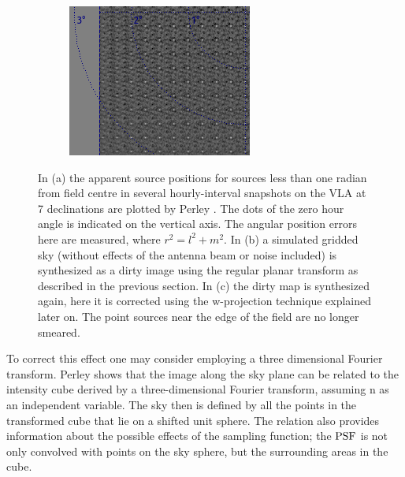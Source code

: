 \begin{figure}[ht!]
\begin{mdframed}
\begin{subfigure}[b]{0.49\textwidth}
      \caption{}
    \end{subfigure}
    \begin{subfigure}[b]{0.49\textwidth}
      \centering
      \includegraphics[width=\textwidth]{images/widefield_corrected_meerkat.png}
      \caption{}
    \end{subfigure}
    \caption[Apparent shift in source position and resulting decorrelation]{In (a) the apparent source positions for sources less than one radian from field centre in 
    several hourly-interval snapshots on the VLA at 7 declinations are plotted by Perley \cite[Lecture 19]{taylor1999synthesis}. The dots of the zero hour angle is indicated on the vertical 
    axis. The angular position errors here are measured, where $r^2=l^2+m^2$. In (b) a simulated gridded sky (without effects of the antenna beam or noise included) is 
    synthesized as a dirty image using the regular planar transform as described in the previous section. In (c) the dirty map is synthesized again, here it is 
    corrected using the w-projection technique explained later on. The point sources near the edge of the field are no longer smeared.}
    \label{fig_position_shifts_and_decorrelation}
  \end{mdframed}
\end{figure}

To correct this effect one may consider employing a three dimensional Fourier transform. Perley \cite[Lecture 19]{taylor1999synthesis} shows that the 
image along the sky plane can be related to the intensity cube derived by a three-dimensional Fourier transform, assuming n as an independent variable. 
The sky then is defined by all the points in the transformed cube that lie on a shifted unit sphere. The relation also provides information about the possible 
effects of the sampling function; the $\textrm{PSF}$ is not only convolved with points on the sky sphere, but the surrounding areas in the cube.

